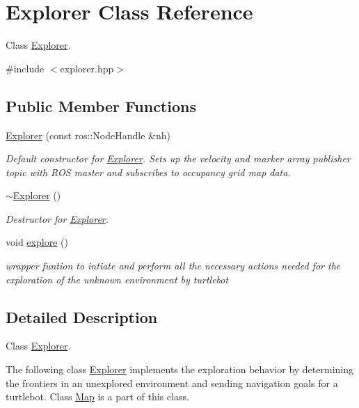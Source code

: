 \hypertarget{classExplorer}{}\section{Explorer Class Reference}
\label{classExplorer}


Class \hyperlink{classExplorer}{Explorer}.  




{\ttfamily \#include $<$explorer.\+hpp$>$}

\subsection*{Public Member Functions}
\begin{DoxyCompactItemize}
\item 
\hyperlink{classExplorer_a023c50586b065e67868726a337fb56e0}{Explorer} (const ros\+::\+Node\+Handle \&nh)
\begin{DoxyCompactList}\small\item\em Default constructor for \hyperlink{classExplorer}{Explorer}. Sets up the velocity and marker array publisher topic with R\+OS master and subscribes to occupancy grid map data. \end{DoxyCompactList}\item 
\hyperlink{classExplorer_aa1b0a71e92e003e9162a5ba99d843392}{$\sim$\+Explorer} ()
\begin{DoxyCompactList}\small\item\em Destructor for \hyperlink{classExplorer}{Explorer}. \end{DoxyCompactList}\item 
void \hyperlink{classExplorer_a246ceb49142bbd15bdbdc3b900269294}{explore} ()
\begin{DoxyCompactList}\small\item\em wrapper funtion to intiate and perform all the necessary actions needed for the exploration of the unknown environment by turtlebot \end{DoxyCompactList}\end{DoxyCompactItemize}


\subsection{Detailed Description}
Class \hyperlink{classExplorer}{Explorer}. 

The following class \hyperlink{classExplorer}{Explorer} implements the exploration behavior by determining the frontiers in an unexplored environment and sending navigation goals for a turtlebot. Class \hyperlink{classMap}{Map} is a part of this class. 

